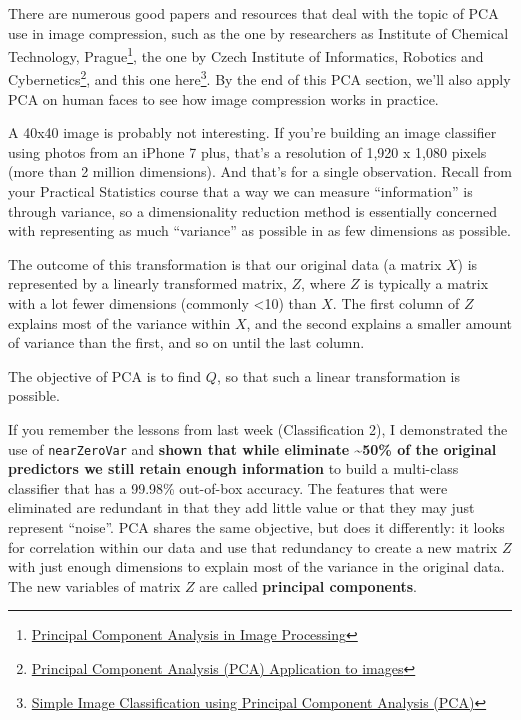 \documentclass[]{article}
\begin{document}
There are numerous good papers and resources that deal with the topic of
PCA use in image compression, such as the one by researchers as
Institute of Chemical Technology, Prague\footnote{\href{https://pdfs.semanticscholar.org/76a7/fc9d87736c8383576865cf50403e53e74848.pdf}{Principal
  Component Analysis in Image Processing}}, the one by Czech Institute
of Informatics, Robotics and Cybernetics\footnote{\href{http://people.ciirc.cvut.cz/~hlavac/TeachPresEn/11ImageProc/15PCA.pdf}{Principal
  Component Analysis (PCA) Application to images}}, and this one
here\footnote{\href{https://ece.gmu.edu/~hayes/courses/MachineLearning/Projects/Presentations/Norko.pdf}{Simple
  Image Classification using Principal Component Analysis (PCA)}}. By
the end of this PCA section, we'll also apply PCA on human faces to see
how image compression works in practice.

A 40x40 image is probably not interesting. If you're building an image
classifier using photos from an iPhone 7 plus, that's a resolution of
1,920 x 1,080 pixels (more than 2 million dimensions). And that's for a
single observation. Recall from your Practical Statistics course that a
way we can measure ``information'' is through variance, so a
dimensionality reduction method is essentially concerned with
representing as much ``variance'' as possible in as few dimensions as
possible.

The outcome of this transformation is that our original data (a matrix
\(X\)) is represented by a linearly transformed matrix, \(Z\), where
\(Z\) is typically a matrix with a lot fewer dimensions (commonly
\textless{}10) than \(X\). The first column of \(Z\) explains most of
the variance within \(X\), and the second explains a smaller amount of
variance than the first, and so on until the last column.

The objective of PCA is to find \(Q\), so that such a linear
transformation is possible.

If you remember the lessons from last week (Classification 2), I
demonstrated the use of \texttt{nearZeroVar} and \textbf{shown that
while eliminate \textasciitilde{}50\% of the original predictors we
still retain enough information} to build a multi-class classifier that
has a 99.98\% out-of-box accuracy. The features that were eliminated are
redundant in that they add little value or that they may just represent
``noise''. PCA shares the same objective, but does it differently: it
looks for correlation within our data and use that redundancy to create
a new matrix \(Z\) with just enough dimensions to explain most of the
variance in the original data. The new variables of matrix \(Z\) are
called \textbf{principal components}.
\end{document}
